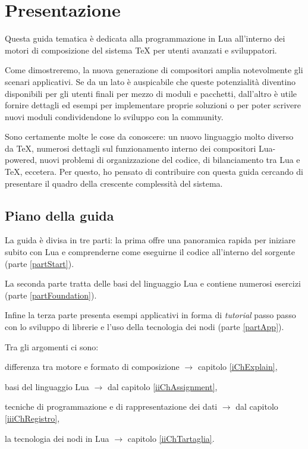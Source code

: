 

\chapter{Presentazione}

Questa guida tematica è dedicata alla programmazione in Lua all'interno dei
motori di composizione del sistema \TeX{} per utenti avanzati e sviluppatori.

Come dimostreremo, la nuova generazione di compositori amplia notevolmente gli
scenari applicativi. Se da un lato è auspicabile che queste potenzialità
diventino disponibili per gli utenti finali per mezzo di moduli e pacchetti,
dall'altro è utile fornire dettagli ed esempi per implementare proprie soluzioni
o per poter scrivere nuovi moduli condividendone lo sviluppo con la community.

Sono certamente molte le cose da conoscere: un nuovo linguaggio molto diverso da
\TeX{}, numerosi dettagli sul funzionamento interno dei compositori Lua-powered,
nuovi problemi di organizzazione del codice, di bilanciamento tra Lua e \TeX,
eccetera. Per questo, ho pensato di contribuire con questa guida cercando di
presentare il quadro della crescente complessità del sistema.


\section{Piano della guida}

La guida è divisa in tre parti: la prima offre una panoramica rapida per
iniziare subito con Lua e comprenderne come eseguirne il codice all'interno del
sorgente (parte \ref{partStart}).

La seconda parte tratta delle basi del linguaggio Lua e contiene numerosi
esercizi (parte \ref{partFoundation}).

Infine la terza parte presenta esempi applicativi in forma di \emph{tutorial}
passo passo con lo sviluppo di librerie e l'uso della tecnologia dei nodi (parte
\ref{partApp}).


Tra gli argomenti ci sono:
\begin{compactitemize}
\item differenza tra motore e formato di composizione \( \to \) capitolo
\ref{iChExplain},
\item basi del linguaggio Lua \( \to \) dal capitolo \ref{iiChAssignment},
\item tecniche di programmazione e di rappresentazione dei dati \( \to \) dal
capitolo \ref{iiiChRegistro},
\item la tecnologia dei nodi in Lua \( \to \) capitolo \ref{iiChTartaglia}.
\end{compactitemize}


